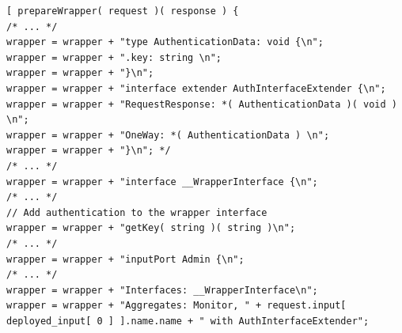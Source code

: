 \documentclass[12pt,a4paper]{article}
\begin{document}
\begin{lstlisting}[caption={Adding courier to service wrapper},label={lst:courierToWrapper}]
[ prepareWrapper( request )( response ) {                                                                                                                                                              
/* ... */
wrapper = wrapper + "type AuthenticationData: void {\n";                                                                                                                                         
wrapper = wrapper + ".key: string \n";                                                                                                                                                           
wrapper = wrapper + "}\n";                                                                                                                                                                                                                                                                                                                                                                                    
wrapper = wrapper + "interface extender AuthInterfaceExtender {\n";                                                                                                                              
wrapper = wrapper + "RequestResponse: *( AuthenticationData )( void ) \n";                                                                                                                       
wrapper = wrapper + "OneWay: *( AuthenticationData ) \n";                                                                                                                                        
wrapper = wrapper + "}\n"; */                                                                                                                                                                    
/* ... */
wrapper = wrapper + "interface __WrapperInterface {\n";                                                                                                                                          
/* ... */
// Add authentication to the wrapper interface                                                                                               
wrapper = wrapper + "getKey( string )( string )\n"; 
/* ... */
wrapper = wrapper + "inputPort Admin {\n";                                                                                                                                                       
/* ... */
wrapper = wrapper + "Interfaces: __WrapperInterface\n";                                                                                                                                          
wrapper = wrapper + "Aggregates: Monitor, " + request.input[ deployed_input[ 0 ] ].name.name + " with AuthInterfaceExtender";


\end{lstlisting}
\end{document}
